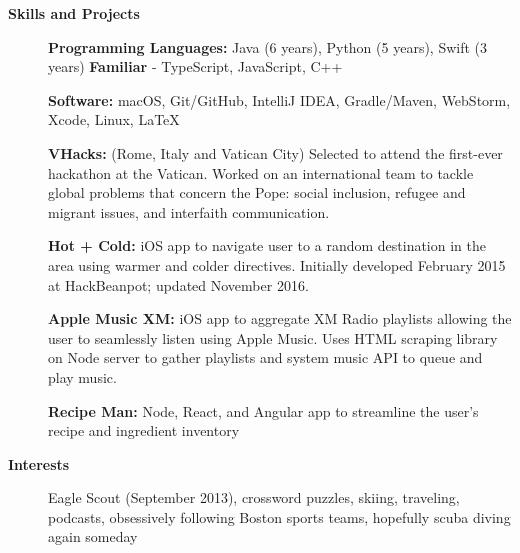 \documentclass[letterpaper,10pt]{article}
\newcommand{\resheading}[1]{{\large \colorbox{mygrey}{\begin{minipage}{\textwidth}{\textbf{#1 \vphantom{p\^{E}}}}\end{minipage}}}}
\begin{document}
\resheading{Skills and Projects}
{\small
	\begin{description}
		\item[] \hspace{0.03in} \textbf{Programming Languages:} {\footnotesize Java (6 years), Python (5 years), Swift (3 years) \enspace \textbf{Familiar} - TypeScript, JavaScript, C++}
		\item[] \hspace{0.03in} \textbf{Software:} {\footnotesize macOS, Git/GitHub, IntelliJ IDEA, Gradle/Maven, WebStorm, Xcode, Linux, \LaTeX}
		\item[] \hspace{0.03in} \textbf{VHacks:} {\footnotesize (Rome, Italy and Vatican City) Selected to attend the first-ever hackathon at the Vatican. Worked on an international team to tackle global problems that concern the Pope: social inclusion, refugee and migrant issues, and interfaith communication.} 
		\item[] \hspace{0.03in} \textbf{Hot + Cold:} {\footnotesize iOS app to navigate user to a random destination in the area using warmer and colder directives. Initially developed February 2015 at HackBeanpot; updated November 2016.}
		\item[] \hspace{0.03in} \textbf{Apple Music XM:} {\footnotesize iOS app to aggregate XM Radio playlists allowing the user to seamlessly listen using Apple Music. Uses HTML scraping library on Node server to gather playlists and system music API to queue and play music.}
		\item[] \hspace{0.03in} \textbf{Recipe Man:} {\footnotesize Node, React, and Angular app to streamline the user's recipe and ingredient inventory}
\end{description}}

\resheading{Interests}
{\small
	\begin{description}
		\item[] \hspace{0.03in} Eagle Scout (September 2013), crossword puzzles, skiing, traveling, podcasts, obsessively following Boston sports teams, hopefully scuba diving again someday
	\end{description}}
\end{document}

